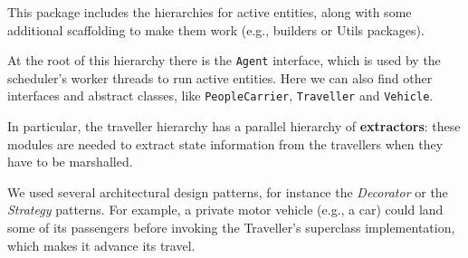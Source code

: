 This package includes the hierarchies for active entities, along with some
additional scaffolding to make them work (e.g., builders or Utils packages).

At the root of this hierarchy there is the \texttt{Agent} interface, which is
used by the scheduler's worker threads to run active entities. Here we can also
find other interfaces and abstract classes, like \texttt{PeopleCarrier},
\texttt{Traveller} and \texttt{Vehicle}.

In particular, the traveller hierarchy has a parallel hierarchy of
\textbf{extractors}: these modules are needed to extract state information from
the travellers when they have to be marshalled.

We used several architectural design patterns, for instance the
\textit{Decorator} or the \textit{Strategy} patterns. For example, a private
motor vehicle (e.g., a car) could land some of its passengers before invoking
the Traveller's superclass implementation, which makes it advance its travel.
